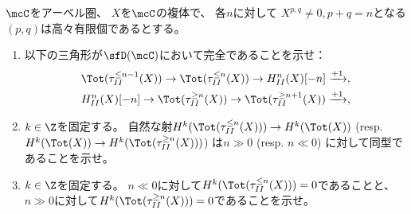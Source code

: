 \documentclass[uplatex,dvipdfmx]{jsarticle}
\begin{document}
\maketitle\HeaderCommentA
\section{}
\fi



\begin{prob}\label{1.25}
  \(\mcC\)をアーベル圏、
  \(X\)を\(\mcC\)の複体で、
  各\(n\)に対して
  \(X^{p,q}\neq 0, p+q=n\)となる\((p,q)\)は高々有限個であるとする。
  \begin{enumerate}
    \item \label{1.25.1}
    以下の三角形が\(\sfD(\mcC)\)において完全であることを示せ：
    \begin{align*}
      \Tot(\tau_{II}^{\leq n-1}(X)) \to
      \Tot(\tau_{II}^{\leq n}(X)) \to
      H_{II}^n(X)[-n] \xrightarrow{+1}, \\
      H_{II}^n(X)[-n] \to
      \Tot(\tau_{II}^{\geq n}(X)) \to
      \Tot(\tau_{II}^{\geq n+1}(X)) \xrightarrow{+1}, \\
    \end{align*}
    \item \label{1.25.2}
    \(k\in \Z\)を固定する。
    自然な射\(H^k(\Tot(\tau_{II}^{\leq n}(X))) \to H^k(\Tot(X))\)
    (resp. \(H^k(\Tot(X))\to H^k(\Tot(\tau_{II}^{\geq n}(X)))\))
    は\(n\gg 0\) (resp. \(n \ll 0\)) に対して同型であることを示せ。
    \item \label{1.25.3}
    \(k\in \Z\)を固定する。
    \(n \ll 0\)に対して\(H^k(\Tot(\tau_{II}^{\leq n}(X))) = 0\)であることと、
    \(n \gg 0\)に対して\(H^k(\Tot(\tau_{II}^{\geq n}(X))) = 0\)であることを示せ。
  \end{enumerate}
\end{prob}
\end{document}
